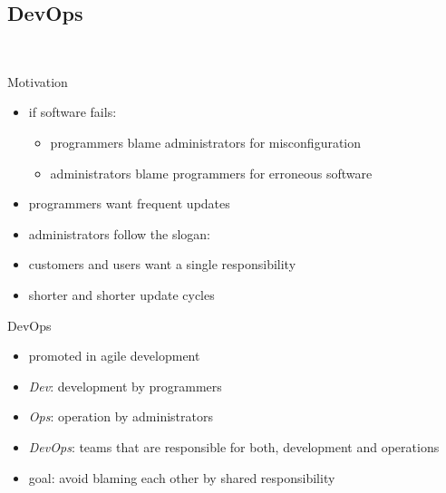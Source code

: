 
\subsection{DevOps}
\begin{frame}{\insertsubsection\ \mytitlesource{\handbuch}}
	\begin{fancycolumns}
		\begin{note}{Motivation}
			\begin{itemize}
				\item if software fails: 
				\begin{itemize}
					\item programmers blame administrators for misconfiguration
					\item administrators blame programmers for erroneous software
				\end{itemize}
				\item programmers want frequent updates
				\item administrators follow the slogan: 
				\item customers and users want a single responsibility
				\item shorter and shorter update cycles
			\end{itemize}
		\end{note}
		\nextcolumn
		\begin{definition}{DevOps}
			\begin{itemize}
				\item promoted in agile development
				\item \emph{Dev}: development by programmers
				\item \emph{Ops}: operation  by administrators
				\item \emph{DevOps}: teams that are responsible for both, development and operations
				\item goal: avoid blaming each other by shared responsibility
			\end{itemize}
		\end{definition}
	\end{fancycolumns}
\end{frame}

\begin{frame}{\insertsubsection}
	\centering{}
\end{frame}

